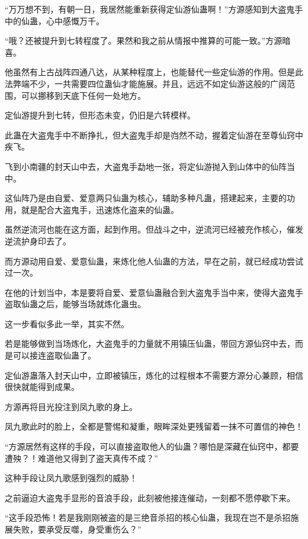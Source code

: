 
\begin{this_body}



“万万想不到，有朝一日，我居然能重新获得定仙游仙蛊啊！”方源感知到大盗鬼手中的仙蛊，心中感慨万千。

“哦？还被提升到七转程度了。果然和我之前从情报中推算的可能一致。”方源暗喜。

他虽然有上古战阵四通八达，从某种程度上，也能替代一些定仙游的作用。但是此法弊端不少，一共需要四位蛊仙才能施展。并且，远远不如定仙游这般的广阔范围，可以挪移到天底下任何一处地方。

定仙游提升到七转，但形态未变，仍旧是六转模样。

此蛊在大盗鬼手中不断挣扎，但大盗鬼手却是岿然不动，握着定仙游在至尊仙窍中疾飞。

飞到小南疆的封天山中去，大盗鬼手勐地一张，将定仙游抛入到山体中的仙阵当中。

这仙阵乃是由自爱、爱意两只仙蛊为核心，辅助多种凡蛊，搭建起来，主要的功用，就是配合大盗鬼手，迅速炼化盗来的仙蛊。

虽然逆流河也能在这方面，起到作用。但战斗之中，逆流河已经被充作核心，催发逆流护身印去了。

而方源动用自爱、爱意仙蛊，来炼化他人仙蛊的方法，早在之前，就已经成功尝试过一次。

在他的计划当中，本是要将自爱、爱意仙蛊融合到大盗鬼手当中来，使得大盗鬼手盗取仙蛊之后，能够当场就炼化蛊虫。

这一步看似多此一举，其实不然。

若是能够做到当场炼化，大盗鬼手的力量就不用镇压仙蛊，带回方源仙窍中去，而是可以接连盗取仙蛊了。

定仙游蛊落入封天山中，立即被镇压，炼化的过程根本不需要方源分心兼顾，相信很快就能得到成果。

方源再将目光投注到凤九歌的身上。

凤九歌此时的脸上，全都是警惕和凝重，眼眸深处更残留着一抹不可置信的神色！

“方源居然有这样的手段，可以直接盗取他人的仙蛊？哪怕是深藏在仙窍中，都要遭殃？！难道他又得到了盗天真传不成？”

这种手段让凤九歌感到强烈的威胁！

之前逼迫大盗鬼手显形的音浪手段，此刻被他接连催动，一刻都不愿停歇下来。

“这手段恐怖！若是我刚刚被盗的是三绝音杀招的核心仙蛊，我现在岂不是杀招施展失败，要承受反噬，身受重伤么？”


\end{this_body}
